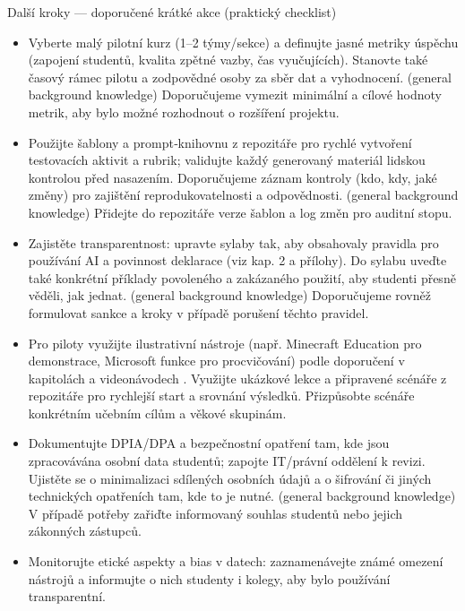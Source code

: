 Další kroky — doporučené krátké akce (praktický checklist)
\begin{itemize}
\item Vyberte malý pilotní kurz (1–2 týmy/sekce) a definujte jasné metriky úspěchu (zapojení studentů, kvalita zpětné vazby, čas vyučujících). Stanovte také časový rámec pilotu a zodpovědné osoby za sběr dat a vyhodnocení. (general background knowledge) Doporučujeme vymezit minimální a cílové hodnoty metrik, aby bylo možné rozhodnout o rozšíření projektu.
\item Použijte šablony a prompt‑knihovnu z repozitáře pro rychlé vytvoření testovacích aktivit a rubrik; validujte každý generovaný materiál lidskou kontrolou před nasazením. Doporučujeme záznam kontroly (kdo, kdy, jaké změny) pro zajištění reprodukovatelnosti a odpovědnosti. (general background knowledge) Přidejte do repozitáře verze šablon a log změn pro auditní stopu.
\item Zajistěte transparentnost: upravte sylaby tak, aby obsahovaly pravidla pro používání AI a povinnost deklarace (viz kap. 2 a přílohy). Do sylabu uveďte také konkrétní příklady povoleného a zakázaného použití, aby studenti přesně věděli, jak jednat. (general background knowledge) Doporučujeme rovněž formulovat sankce a kroky v případě porušení těchto pravidel.
\item Pro piloty využijte ilustrativní nástroje (např. Minecraft Education pro demonstrace, Microsoft funkce pro procvičování) podle doporučení v kapitolách a videonávodech \cite{kb_ai_101_tipu_pdf_04e4a115_page_15_2, kb_ai_101_tipu_pdf_04e4a115_page_8_1}. Využijte ukázkové lekce a připravené scénáře z repozitáře pro rychlejší start a srovnání výsledků. Přizpůsobte scénáře konkrétním učebním cílům a věkové skupinám.
\item Dokumentujte DPIA/DPA a bezpečnostní opatření tam, kde jsou zpracovávána osobní data studentů; zapojte IT/právní oddělení k revizi. Ujistěte se o minimalizaci sdílených osobních údajů a o šifrování či jiných technických opatřeních tam, kde to je nutné. (general background knowledge) V případě potřeby zařiďte informovaný souhlas studentů nebo jejich zákonných zástupců.
\item Monitorujte etické aspekty a bias v datech: zaznamenávejte známé omezení nástrojů a informujte o nich studenty i kolegy, aby bylo používání transparentní.
\end{itemize}

